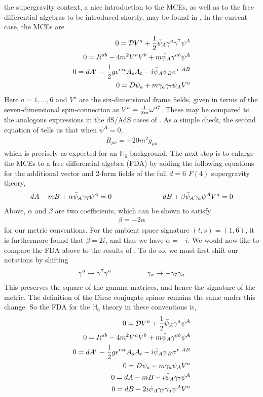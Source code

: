 \documentclass[12pt]{article}
\begin{document}
 the supergravity context, a nice introduction to the MCEs, as well as to the free differential algebras to be introduced shortly, may be found in . In the current case, the MCEs are 
\begin{eqnarray}
0 ={\cal D} V^a + {1\over 2} \bar \psi_A \gamma^a \gamma^7 \psi^A 
\nonumber\\
0= R^{ab} - 4 m^2 V^a V^b + m \bar \psi_A \gamma^{a b} \psi^A 
\nonumber\\
0= d A^r - {1\over 2} g \epsilon^{rst} A_s A_t - i \bar \psi_A \psi_B \sigma^{r\,\,AB}
\nonumber\\
0= D \psi_a + m \gamma_a \gamma_7 \psi_A V^a
\end{eqnarray}
Here $a = 1,\dots,6$ and $V^a$ are the six-dimensional frame fields, given in terms of the seven-dimensional spin-connection as $V^a= {1 \over 2m}\omega^{a7}$. These may be compared to the analogous expressions in the dS/AdS cases of . 
As a simple check, the second equation of  tells us that when $\psi^A =0$, 
\begin{eqnarray}
R_{\mu \nu} = - 20 m^2 g_{\mu \nu}
\end{eqnarray}
which is precisely as expected for an $\mathbb{H}_6$ background.
The next step is to enlarge the MCEs to a free differential algebra (FDA) by adding the following equations for the additional vector and 2-form fields of the full $d=6$ $F(4)$ supergravity theory, 
\begin{eqnarray}
dA - m B + \alpha \bar \psi_A \gamma_7 \psi^A = 0 \hspace{1 in} d B + \beta \bar \psi_A \gamma_a \psi^A V^a = 0
\end{eqnarray}
Above, $\alpha$ and $\beta$ are two coefficients, which can be shown  to satisfy 
\begin{eqnarray}
\beta = - 2 \alpha
\end{eqnarray}
for our metric conventions. For the ambient space signature $(t,s) = (1,6)$, it is furthermore found that $\beta = 2i$, and thus we have $\alpha = -i$. 
We would now like to compare the FDA above to the results of . To do so, we must first shift our notations by shifting 
\begin{eqnarray}
\gamma^a \rightarrow \gamma^7 \gamma^a \hspace{0.7 in} \gamma_a \rightarrow - \gamma_7 \gamma_a
\end{eqnarray}
This preserves the square of the gamma matrices, and hence the signature of the metric. The definition of the Dirac conjugate spinor  remains the same under this change. So the FDA for the $\mathbb{H}_6$ theory in these conventions is, 
\begin{eqnarray}
0 ={\cal D} V^a + {1\over 2} \bar \psi_A \gamma^a \psi^A 
\nonumber\\
0= R^{ab} - 4 m^2 V^a V^b + m \bar \psi_A \gamma^{a b} \psi^A 
\nonumber\\
0= d A^r - {1\over 2} g \epsilon^{rst} A_s A_t - i \bar \psi_A \psi_B \sigma^{r\,\,AB}
\nonumber\\
0= D \psi_a - m \gamma_a \psi_A V^a
\nonumber\\
0=dA - m B - i \bar \psi_A \gamma_7 \psi^A 
\nonumber\\
0=d B -2 i \bar \psi_A \gamma_7 \gamma_a \psi^A V^a
\end{eqnarray}
\end{document}
